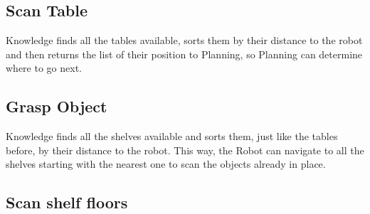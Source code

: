 \documentclass[main.tex]{subfiles}
\begin{document}
	\subsection{Scan Table}
	
	
	
Knowledge finds all the tables available, sorts them by their distance to the robot and then returns the list of their position to Planning, so Planning can determine where to go next.
	
	
	
	
	
	
	
	
	
	
	
	\subsection{Grasp Object}
	
	
	
	
	
	
Knowledge finds all the shelves available and sorts them, just like the tables before, by their distance to the robot. This way, the Robot can navigate to all the shelves starting with the nearest one to scan the objects already in place.
	
	
	\subsection{Scan shelf floors}
	
	
	
\end{document}
